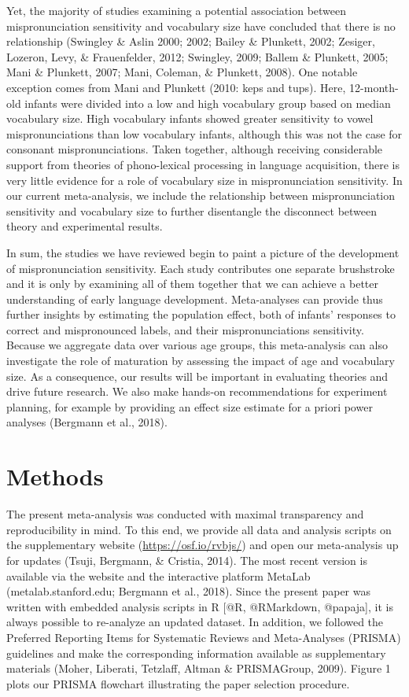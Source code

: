 \documentclass[man]{apa6}
\theoremstyle{definition}
\theoremstyle{definition}
\theoremstyle{definition}
\theoremstyle{remark}
\begin{document}
Yet, the majority of studies examining a potential association between
mispronunciation sensitivity and vocabulary size have concluded that
there is no relationship (Swingley \& Aslin 2000; 2002; Bailey \&
Plunkett, 2002; Zesiger, Lozeron, Levy, \& Frauenfelder, 2012; Swingley,
2009; Ballem \& Plunkett, 2005; Mani \& Plunkett, 2007; Mani, Coleman,
\& Plunkett, 2008). One notable exception comes from Mani and Plunkett
(2010: keps and tups). Here, 12-month-old infants were divided into a
low and high vocabulary group based on median vocabulary size. High
vocabulary infants showed greater sensitivity to vowel mispronunciations
than low vocabulary infants, although this was not the case for
consonant mispronunciations. Taken together, although receiving
considerable support from theories of phono-lexical processing in
language acquisition, there is very little evidence for a role of
vocabulary size in mispronunciation sensitivity. In our current
meta-analysis, we include the relationship between mispronunciation
sensitivity and vocabulary size to further disentangle the disconnect
between theory and experimental results.

In sum, the studies we have reviewed begin to paint a picture of the
development of mispronunciation sensitivity. Each study contributes one
separate brushstroke and it is only by examining all of them together
that we can achieve a better understanding of early language
development. Meta-analyses can provide thus further insights by
estimating the population effect, both of infants' responses to correct
and mispronounced labels, and their mispronunciations sensitivity.
Because we aggregate data over various age groups, this meta-analysis
can also investigate the role of maturation by assessing the impact of
age and vocabulary size. As a consequence, our results will be important
in evaluating theories and drive future research. We also make hands-on
recommendations for experiment planning, for example by providing an
effect size estimate for a priori power analyses (Bergmann et al.,
2018).

\section{Methods}\label{methods}

The present meta-analysis was conducted with maximal transparency and
reproducibility in mind. To this end, we provide all data and analysis
scripts on the supplementary website (\url{https://osf.io/rvbjs/}) and
open our meta-analysis up for updates (Tsuji, Bergmann, \& Cristia,
2014). The most recent version is available via the website and the
interactive platform MetaLab (metalab.stanford.edu; Bergmann et al.,
2018). Since the present paper was written with embedded analysis
scripts in R {[}@R, @RMarkdown, @papaja{]}, it is always possible to
re-analyze an updated dataset. In addition, we followed the Preferred
Reporting Items for Systematic Reviews and Meta-Analyses (PRISMA)
guidelines and make the corresponding information available as
supplementary materials (Moher, Liberati, Tetzlaff, Altman \&
PRISMAGroup, 2009). Figure 1 plots our PRISMA flowchart illustrating the
paper selection procedure.
\end{document}
